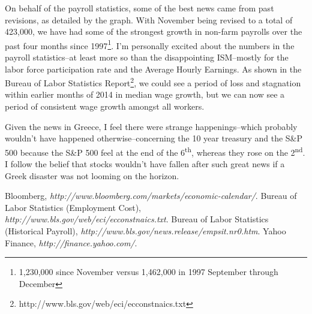 \documentclass[11pt,letterpaper,english]{article}
\begin{document}
\noindent On behalf of the payroll statistics, some of the best news came from past revisions, as detailed by the graph. With November being revised to a total of 423,000, we have had some of the strongest growth in non-farm payrolls over the past four months since 1997\footnote[1]{1,230,000 since November versus 1,462,000 in 1997 September through December}. I'm personally excited about the numbers in the payroll statistics--at least more so than the disappointing ISM--mostly for the labor force participation rate and the Average Hourly Earnings. As shown in the Bureau of Labor Statistics Report\footnote[2]{http://www.bls.gov/web/eci/ecconstnaics.txt}, we could see a period of loss and stagnation within earlier months of 2014 in median wage growth, but we can now see a period of consistent wage growth amongst all workers.
\vspace{2.5mm}

\noindent Given the news in Greece, I feel there were strange happenings--which probably wouldn't have happened otherwise--concerning the 10 year treasury and the S\&P 500 because the S\&P 500 feel at the end of the 6\textsuperscript{th}, whereas they rose on the 2\textsuperscript{nd}. I follow the belief that stocks wouldn't have fallen after such great news if a Greek disaster was not looming on the horizon.


\newpage
\begin{thebibliography}{9}
    Bloomberg,
    \emph{http://www.bloomberg.com/markets/economic-calendar/}.
    Bureau of Labor Statistics (Employment Cost),
    \emph{http://www.bls.gov/web/eci/ecconstnaics.txt}.
    Bureau of Labor Statistics (Historical Payroll),
    \emph{http://www.bls.gov/news.release/empsit.nr0.htm}.
    Yahoo Finance,
    \emph{http://finance.yahoo.com/}.
\end{thebibliography}
\end{document}

